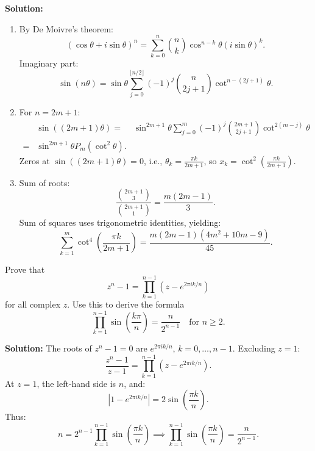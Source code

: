 \textbf{Solution:}
\begin{enumerate}[label=\textbf{(\alph*)}]
\item By De Moivre's theorem:
\[
(\cos \theta + i \sin \theta)^n = \sum_{k=0}^n \binom{n}{k} \cos^{n-k} \theta (i \sin \theta)^k.
\]
Imaginary part:
\[
\sin(n\theta) = \sin \theta \sum_{j=0}^{\lfloor n/2 \rfloor} (-1)^j \binom{n}{2j+1} \cot^{n-(2j+1)} \theta.
\]
\item For \( n = 2m+1 \):
\begin{align*}
& \sin((2m+1)\theta) 
=& \sin^{2m+1} \theta \sum_{j=0}^m (-1)^j \binom{2m+1}{2j+1} \cot^{2(m-j)} \theta \\
=& \sin^{2m+1} \theta P_m(\cot^2 \theta).
\end{align*}
Zeros at \( \sin((2m+1)\theta) = 0 \), i.e., \( \theta_k = \frac{\pi k}{2m+1} \), so \( x_k = \cot^2 \left( \frac{\pi k}{2m+1} \right) \).
\item Sum of roots:
\[
\frac{\binom{2m+1}{3}}{\binom{2m+1}{1}} = \frac{m(2m-1)}{3}.
\]
Sum of squares uses trigonometric identities, yielding:
\[
\sum_{k=1}^m \cot^4 \left( \frac{\pi k}{2m+1} \right) = \frac{m(2m-1)(4m^2 + 10m - 9)}{45}.
\]
\end{enumerate}

\begin{problembox}
Prove that
\[
z^n - 1 = \prod_{k=1}^{n-1} \left(z - e^{2\pi i k/n}\right)
\]
for all complex \( z \). Use this to derive the formula
\[
\prod_{k=1}^{n-1} \sin \left( \frac{k\pi}{n} \right) = \frac{n}{2^{n-1}} \quad \text{for } n \geq 2.
\]
\end{problembox}

\textbf{Solution:}
The roots of \( z^n - 1 = 0 \) are \( e^{2\pi i k/n} \), \( k = 0, \ldots, n-1 \). Excluding \( z = 1 \):
\[
\frac{z^n - 1}{z - 1} = \prod_{k=1}^{n-1} (z - e^{2\pi i k/n}).
\]
At \( z = 1 \), the left-hand side is \( n \), and:
\[
|1 - e^{2\pi i k/n}| = 2 \sin\left( \frac{\pi k}{n} \right).
\]
Thus:
\[
n = 2^{n-1} \prod_{k=1}^{n-1} \sin\left( \frac{\pi k}{n} \right) \implies \prod_{k=1}^{n-1} \sin\left( \frac{\pi k}{n} \right) = \frac{n}{2^{n-1}}.
\]
